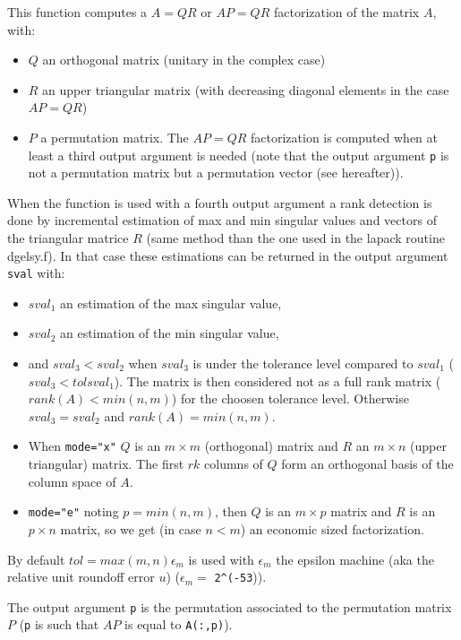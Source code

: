 \begin{mandescription}
This function computes a $A = Q R$ or $A P = QR$ factorization of 
the matrix $A$, with:
\begin{itemize}
\item $Q$ an orthogonal matrix (unitary in the complex case) 
\item $R$ an upper triangular matrix (with decreasing diagonal 
      elements in the case $A P = QR$) 
\item $P$ a permutation matrix. The $A P = QR$ factorization is 
      computed when at least a third output argument is needed
      (note that the output argument \verb+p+ is not a permutation matrix
       but a permutation vector (see hereafter)). 
\end{itemize}

When the function is used with a fourth output argument 
a rank detection is done by incremental estimation of max and min
singular values and vectors of the triangular matrice $R$ (same method
than the one used in the lapack routine dgelsy.f). In that case these
estimations can be returned in the output argument \verb+sval+ with:
\begin{itemize}
\item $sval_1$ an estimation of the max singular value,
\item $sval_2$ an estimation of the min singular value,
\item and $sval_3 < sval_2$ when $sval_3$ is under the tolerance 
      level compared to $sval_1$ ($sval_3 < tol sval_1$). The matrix
      is then considered not as a full rank matrix
      ($rank(A)<min(n,m)$) for the choosen tolerance level. 
      Otherwise $sval_3 = sval_2$ and $rank(A)=min(n,m)$.
\end{itemize}

\begin{itemize}
   \item When \verb+mode="x"+ $Q$ is an $m \times m$ (orthogonal) matrix and
         $R$ an  $m \times n$ (upper triangular) matrix. The first
         $rk$ columns of $Q$ form an orthogonal basis of the column
         space of $A$.
   \item  \verb+mode="e"+ noting $p=min(n,m)$, then $Q$ is an $m \times p$ matrix and $R$ is
         an $p \times n$ matrix, so we get (in case $n<m$) an economic
         sized factorization.
\end{itemize}
  
By default $tol = max(m,n) \epsilon_m$ is used with $\epsilon_m$ the epsilon
machine (aka the relative unit roundoff error $u$) ($\epsilon_m =$ \verb+2^(-53+)).

The output argument \verb+p+ is the permutation associated
to the permutation matrix $P$ (\verb+p+ is such that $AP$ is equal to \verb+A(:,p)+).

\end{mandescription}

